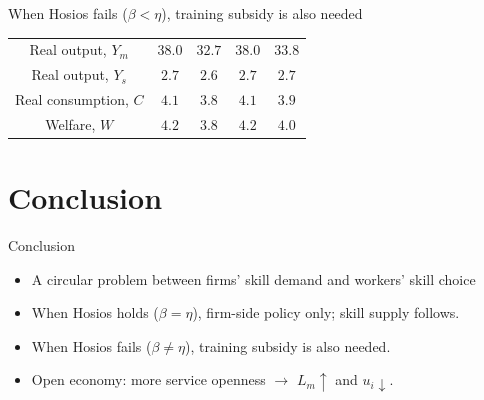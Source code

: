 \documentclass[9pt,xcolor={svgnames}]{beamer}
\begin{document}
\begin{frame}{When Hosios fails ($\beta<\eta$), training subsidy is also needed}
\begin{table}[H]
{\begin{tabular}{||c c c c c||}
Real output, $Y_m$ & \cellcolor{gray!15}$38.0$ & $32.7$ & \cellcolor{gray!15}$38.0$ & $33.8$ \\
Real output, $Y_s$ & \cellcolor{gray!15}$2.7$ & $2.6$ & \cellcolor{gray!15}$2.7$ & $2.7$ \\
Real consumption, $C$ & \cellcolor{gray!15}$4.1$ & $3.8$ & \cellcolor{gray!15}$4.1$ & $3.9$ \\
Welfare, $W$ & \cellcolor{gray!15}$4.2$ & $3.8$ & \cellcolor{gray!15}$4.2$ & $4.0$ \\
\hline
\end{tabular}}
\end{table}

\end{frame}


\section{Conclusion}
\begin{frame}{Conclusion}\label{main:conclusion}
\small
\begin{itemize}

\item A circular problem between firms' skill demand and workers' skill choice 

\medskip




\medskip
 \item  When Hosios  holds ($\beta=\eta$), firm-side policy only; skill supply follows.


 \medskip

 \item When Hosios fails ($\beta \neq \eta$),  training subsidy is also needed.


\medskip
\item Open economy: more service openness $\rightarrow$ $L_m \uparrow$ and $u_i  \downarrow$.  \hyperlink{app:open}{}









\end{itemize}


\end{frame}
\end{document}
